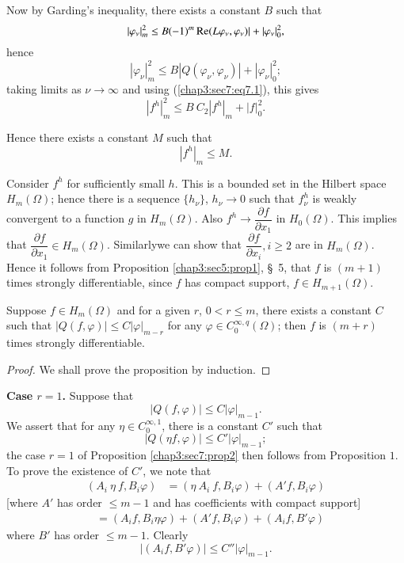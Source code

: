 Now by Garding's inequality, there exists a constant $B$ such that
$$
| \varphi_\nu |^2_m \leq B(-1)^m \operatorname{Re} (L \varphi_\nu, \varphi_\nu) | +
| \varphi_\nu|^2_0, 
$$
hence
$$
| \varphi_\nu |^2_m \leq B | Q (\varphi_\nu, \varphi_\nu) | + |
\varphi_\nu |^2_0; 
$$
taking limits as $\nu \rightarrow \infty$ and using
(\ref{chap3:sec7:eq7.1}), this gives  
$$
| f^h |^2_m \leq B ~ C_2 | f^h |_m + | f |^2_0.
$$

Hence there exists a constant $M$ such that 
$$
| f^h |_m \leq M.
$$

Consider $f^h$ for sufficiently small $h$. This is a bounded set in
the Hilbert space $H_m(\Omega)$; hence there is a sequence $\{
h_\nu\}$, $h_\nu \rightarrow 0$ such that $f ^{h}_\nu$ is weakly
convergent to a function $g$ in $H_m (\Omega)$. Also $f^h \rightarrow
\dfrac{\partial f}{\partial x_1}$ in $H_0(\Omega)$. This implies that
$\dfrac{\partial f}{\partial x_1} \in H_m (\Omega)$. Similarly\pageoriginale we can
show that $\dfrac{\partial f}{\partial x_i}, i \geq 2$ are in
$H_m(\Omega)$. Hence it follows from Proposition \ref{chap3:sec5:prop1}, \S\ 5, that $f$ is
$(m+1)$ times strongly differentiable, since $f$ has compact support,
$f \in H_{m+1} (\Omega )$. 

\begin{proposition}\label{chap3:sec7:prop2}%
  Suppose $f \in H_m (\Omega )$ and for a  given $r$, $0 < r \leq m$,
  there exists a constant $C$ such that $| Q (f, \varphi) | \leq C |
  \varphi |_{m-r}$ for any $\varphi \in C^{\infty, q}_0(\Omega)$; then
  $f$ is $(m+r)$ times strongly differentiable.  
\end{proposition}

\begin{proof}%
  We shall prove the proposition by induction.
\end{proof}

\noindent
\textbf{Case $r = 1$.} Suppose that 
$$
| Q (f, \varphi ) | \leq C | \varphi |_{m-1}.
$$
We assert that for any $\eta \in C^{\infty, 1}_0$, there is a constant
$C'$ such that  
$$
| Q (\eta f, \varphi ) | \leq C' | \varphi |_{m-1};
$$
the case $r = 1$ of Proposition \ref{chap3:sec7:prop2} then follows from Proposition
$1$. To prove the existence of $C'$, we note that  
\begin{align*}
  (A_i ~ \eta ~ f, B_i \varphi) & = (\eta ~ A_i ~ f, B_i \varphi ) +
  (A' f, B_i \varphi) 
\end{align*}
[where $A'$ has order $\leq m-1$ and has coefficients with compact
  support]
\begin{align*}   
  & = (A_i f, B_i \eta \varphi ) + (A' f, B_i \varphi ) + (A_i f, B' \varphi )
\end{align*}
where $B'$ has order $\leq m-1$. Clearly
$$
| (A_i f, B' \varphi ) | \leq C'' | \varphi |_{m-1}.
$$

